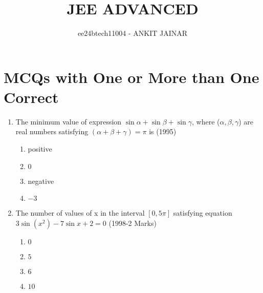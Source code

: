 \documentclass[journal,12pt,twocolumn]{IEEEtran}
\theoremstyle{remark}
\begin{document}

\vspace{3cm}

\title{JEE ADVANCED}
\author{ee24btech11004 - ANKIT JAINAR}
\maketitle
\newpage
\bigskip

\renewcommand{\thefigure}{\theenumi}
\renewcommand{\thetable}{\theenumi}
\section{MCQs with One or More than One Correct}
\begin{enumerate}
\item The minimum value of expression $\sin{\alpha} + \sin{\beta} + \sin{\gamma}$, where ($\alpha,\beta,\gamma$) are real numbers satisfying $(\alpha+\beta+\gamma)=\pi$  is \hfill(1995)
\begin{enumerate}
    \item positive
    \item $0$
    \item negative 
    \item $-3$
\end{enumerate}
\item The number of values of x in the interval $[0,5\pi]$ satisfying equation $3 \sin{(x^2)}-7 \sin{x+2}=0$ \hfill(1998-2 Marks) 
\begin{enumerate}
    \item $0$
    \item $5$
    \item $6$
    \item $10$
\end{enumerate}


\end{enumerate}
\end{document}

